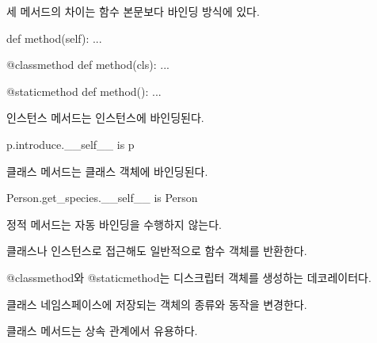 \begin{dhknote}
\begin{dhksmry}[centered]
세 메서드의 차이는 함수 본문보다 바인딩 방식에 있다.
\end{dhksmry}
\end{dhknote}

\begin{dhkcode}
def method(self):
    ...


@classmethod
def method(cls):
    ...


@staticmethod
def method():
    ...
\end{dhkcode}

\begin{dhknote}
\begin{dhksmry}[centered]
인스턴스 메서드는 인스턴스에 바인딩된다.
\end{dhksmry}
\end{dhknote}

\begin{dhkcode}
p.introduce.__self__ is p
\end{dhkcode}

\begin{dhknote}
\begin{dhksmry}[centered]
클래스 메서드는 클래스 객체에 바인딩된다.
\end{dhksmry}
\end{dhknote}

\begin{dhkcode}
Person.get_species.__self__ is Person
\end{dhkcode}

\begin{dhknote}
\begin{dhksmry}[centered]
정적 메서드는 자동 바인딩을 수행하지 않는다.
\end{dhksmry}
\end{dhknote}

클래스나 인스턴스로 접근해도 일반적으로 함수 객체를 반환한다.

\begin{dhknote}
\begin{dhksmry}[centered]
@classmethod와 @staticmethod는
디스크립터 객체를 생성하는 데코레이터다.
\end{dhksmry}
\end{dhknote}

클래스 네임스페이스에 저장되는 객체의 종류와  동작을 변경한다.

\begin{dhknote}
\begin{dhksmry}[centered]
클래스 메서드는 상속 관계에서 유용하다.
\end{dhksmry}
\end{dhknote}

